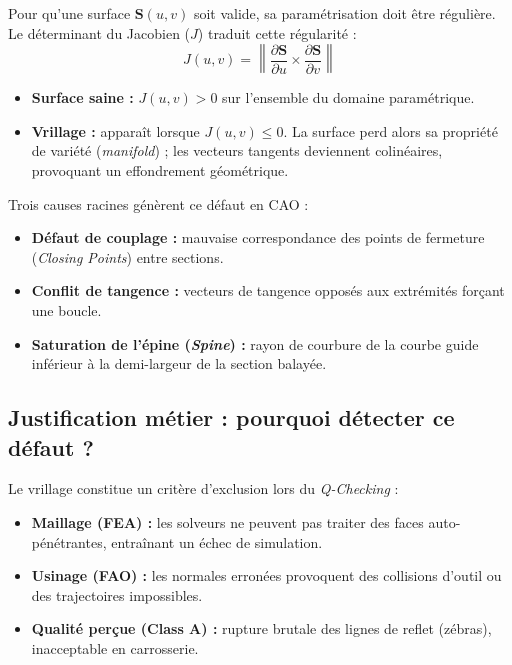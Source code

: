 Pour qu'une surface $\mathbf{S}(u,v)$ soit valide, sa paramétrisation doit être régulière. Le déterminant du Jacobien ($J$) traduit cette régularité :
\begin{equation*}
    J(u,v) = \left\| \frac{\partial \mathbf{S}}{\partial u} \times \frac{\partial \mathbf{S}}{\partial v} \right\|
\end{equation*}

\begin{itemize}
    \item[�] \textbf{Surface saine :} $J(u,v) > 0$ sur l'ensemble du domaine paramétrique.
    \item[�] \textbf{Vrillage :} apparaît lorsque $J(u,v) \le 0$. La surface perd alors sa propriété de variété (\textit{manifold}) ; les vecteurs tangents deviennent colinéaires, provoquant un effondrement géométrique.
\end{itemize}

Trois causes racines génèrent ce défaut en CAO :
\begin{itemize}
    \item[�] \textbf{Défaut de couplage :} mauvaise correspondance des points de fermeture (\textit{Closing Points}) entre sections.
    \item[�] \textbf{Conflit de tangence :} vecteurs de tangence opposés aux extrémités forçant une boucle.
    \item[�] \textbf{Saturation de l'épine (\textit{Spine}) :} rayon de courbure de la courbe guide inférieur à la demi-largeur de la section balayée.
\end{itemize}

\subsection{Justification métier : pourquoi détecter ce défaut ?}

Le vrillage constitue un critère d'exclusion lors du \textit{Q-Checking} :

\begin{itemize}
    \item[�] \textbf{Maillage (FEA) :} les solveurs ne peuvent pas traiter des faces auto-pénétrantes, entraînant un échec de simulation.
    \item[�] \textbf{Usinage (FAO) :} les normales erronées provoquent des collisions d'outil ou des trajectoires impossibles.
    \item[�] \textbf{Qualité perçue (Class A) :} rupture brutale des lignes de reflet (zébras), inacceptable en carrosserie.
\end{itemize}

